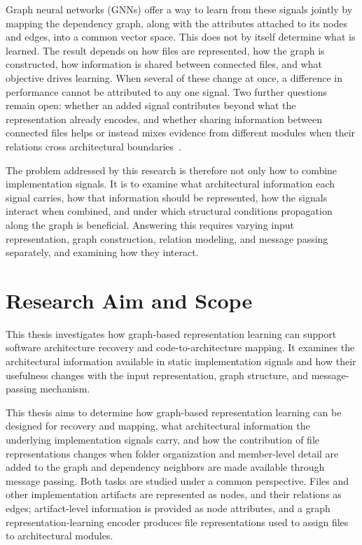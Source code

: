 Graph neural networks (GNNs) offer a way to learn from these signals jointly by mapping the dependency graph, along with the attributes attached to its nodes and edges, into a common vector space. This does not by itself determine what is learned. The result depends on how files are represented, how the graph is constructed, how information is shared between connected files, and what objective drives learning. When several of these change at once, a difference in performance cannot be attributed to any one signal. Two further questions remain open: whether an added signal contributes beyond what the representation already encodes, and whether sharing information between connected files helps or instead mixes evidence from different modules when their relations cross architectural boundaries~\cite{gnn_homophily}.

The problem addressed by this research is therefore not only how to combine implementation signals. It is to examine what architectural information each signal carries, how that information should be represented, how the signals interact when combined, and under which structural conditions propagation along the graph is beneficial. Answering this requires varying input representation, graph construction, relation modeling, and message passing separately, and examining how they interact.

\section{Research Aim and Scope}
\label{sec:aim_scope}

This thesis investigates how graph-based representation learning can support software architecture recovery and code-to-architecture mapping. It examines the architectural information available in static implementation signals and how their usefulness changes with the input representation, graph structure, and message-passing mechanism.

This thesis aims to determine how graph-based representation learning can be designed for recovery and mapping, what architectural information the underlying implementation signals carry, and how the contribution of file representations changes when folder organization and member-level detail are added to the graph and dependency neighbors are made available through message passing. Both tasks are studied under a common perspective. Files and other implementation artifacts are represented as nodes, and their relations as edges; artifact-level information is provided as node attributes, and a graph representation-learning encoder produces file representations used to assign files to architectural modules.

